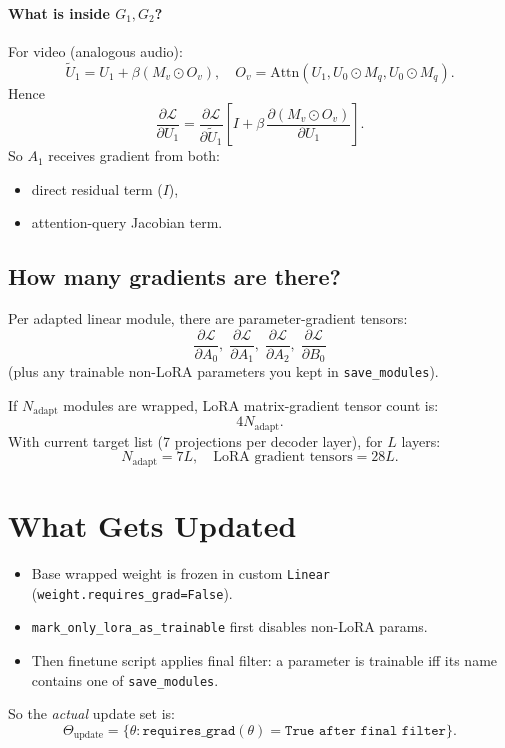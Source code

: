 \documentclass[11pt]{article}
\begin{document}
\paragraph{What is inside $G_1,G_2$?}
For video (analogous audio):
\[
\widetilde U_1 = U_1 + \beta(M_v\odot O_v),\quad O_v=\text{Attn}(U_1,U_0\odot M_q,U_0\odot M_q).
\]
Hence
\[
\frac{\partial\mathcal L}{\partial U_1}
=
\frac{\partial\mathcal L}{\partial \widetilde U_1}
\left[
I
+
\beta\,\frac{\partial (M_v\odot O_v)}{\partial U_1}
\right].
\]
So $A_1$ receives gradient from both:
\begin{itemize}
\item direct residual term ($I$),
\item attention-query Jacobian term.
\end{itemize}

\subsection{How many gradients are there?}
Per adapted linear module, there are parameter-gradient tensors:
\[
\frac{\partial\mathcal L}{\partial A_0},\;
\frac{\partial\mathcal L}{\partial A_1},\;
\frac{\partial\mathcal L}{\partial A_2},\;
\frac{\partial\mathcal L}{\partial B_0}
\]
(plus any trainable non-LoRA parameters you kept in \texttt{save\_modules}).

If $N_{\text{adapt}}$ modules are wrapped, LoRA matrix-gradient tensor count is:
\[
4N_{\text{adapt}}.
\]
With current target list (7 projections per decoder layer), for $L$ layers:
\[
N_{\text{adapt}} = 7L,\quad \text{LoRA gradient tensors}=28L.
\]

\section{What Gets Updated}
\begin{itemize}
\item Base wrapped weight is frozen in custom \texttt{Linear} (\texttt{weight.requires\_grad=False}).
\item \texttt{mark\_only\_lora\_as\_trainable} first disables non-LoRA params.
\item Then finetune script applies final filter: a parameter is trainable iff its name contains one of \texttt{save\_modules}.
\end{itemize}
So the \emph{actual} update set is:
\[
\Theta_{\text{update}}=\{\theta:\texttt{requires\_grad}(\theta)=\texttt{True after final filter}\}.
\]
\end{document}
